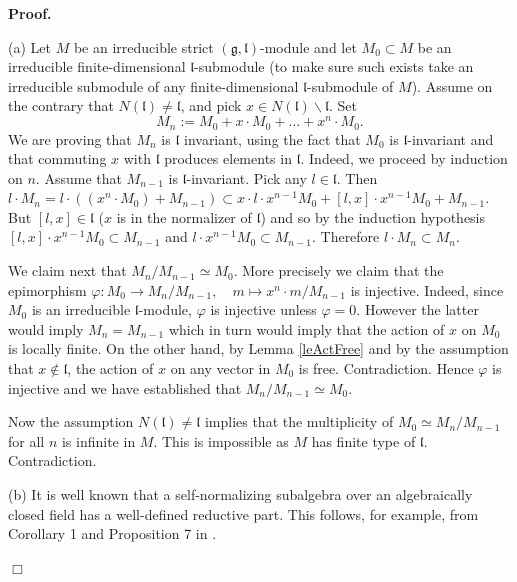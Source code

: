 \documentclass[12pt]{report}
\newenvironment{proof}[1][]{ \textbf{Proof#1. }}{$\Box$\medskip}
\newcommand{\gG}{\mathfrak{g}}
\newcommand{\lL}{\mathfrak{l}}
\renewcommand {\phi} {\varphi}
\newcommand{\refle}[1]{Lemma \ref{#1}}
\newcommand{\ad}{\mathrm{ad~}}
\begin{document}
\begin{proof}

(a) Let $M$ be an irreducible strict $(\gG,\lL)$-module and let $M_0\subset M$ be an irreducible finite-dimensional $\lL$-submodule (to make sure such exists take an irreducible submodule of any finite-dimensional $\lL$-submodule of $M$). %
Assume on the contrary that $N(\lL)\neq\lL$, and pick $x\in N(\lL)\backslash\lL$. Set
\[
M_n:=M_0+x\cdot M_0+\dots+x^n\cdot M_0.
\]
We are proving that $M_n$ is $\lL$ invariant, using the fact that $M_0$ is $\lL$-invariant and that commuting $x$ with $\lL$ produces elements in $\lL$. Indeed, we proceed by induction on $n$. Assume that $M_{n-1}$ is $\lL$-invariant. Pick any $l\in\lL$. Then $l\cdot M_n= l\cdot ((x^n\cdot M_0)+M_{n-1})\subset x\cdot l\cdot x^{n-1}M_0+[l,x]\cdot x^{n-1}M_0+M_{n-1}$. But $[l,x]\in\lL$ ($x$ is in the normalizer of $\lL$) and so by the induction hypothesis $[l,x]\cdot x^{n-1}M_0\subset M_{n-1}$ and $l\cdot x^{n-1}M_0\subset M_{n-1}$. Therefore $l\cdot M_n\subset M_n$.

We claim next that $M_{n}/M_{n-1}\simeq M_0$. More precisely we claim that the epimorphism $\phi:M_0\to M_n/M_{n-1},\quad m\mapsto x^n\cdot m/M_{n-1}$ is injective. Indeed, since $M_0$ is an irreducible $\lL$-module, $\phi$ is injective unless $\phi=0$. However the latter would imply $M_{n}=M_{n-1}$ which in turn would imply that the action of $x$ on $M_0$ is locally finite. On the other hand, by \refle{leActFree} and by the assumption that $x\notin\lL$, the action of $x$ on any vector in $M_0$ is free. Contradiction. Hence $\phi$ is injective and we have established that $M_{n}/M_{n-1}\simeq M_0$.

Now the assumption $N(\lL)\neq\lL$ implies that the multiplicity of $M_0\simeq M_n/M_{n-1}$ for all $n$ is infinite in $M$. This is impossible as $M$ has finite type of $\lL$. Contradiction.

(b) It is well known that a self-normalizing subalgebra over an algebraically closed field has a well-defined reductive part. This follows, for example, from Corollary 1 and Proposition 7 in \cite[Chapter 7,\S 5]{Bourbaki}.


\end{proof}
\end{document}
